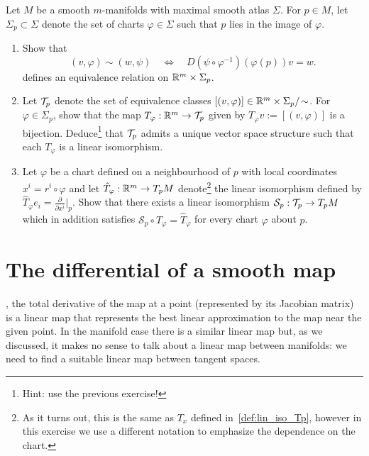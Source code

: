 \begin{exercise}
Let $M$ be a smooth $m$-manifolds with maximal smooth atlas $\Sigma$.
For $p\in M$, let $\Sigma_p \subset \Sigma$ denote the set of charts $\varphi\in\Sigma$ such that $p$ lies in the image of $\varphi$.
\begin{enumerate}
  \item Show that
  \begin{equation}
    (v,\varphi) \sim (w, \psi)
    \quad\Longleftrightarrow\quad
    D(\psi \circ \varphi^{-1})(\varphi(p))v = w.
  \end{equation}
  defines an equivalence relation on $\mathbb{R}^m\times\Sigma_p$.
  \item Let $\mathcal{T}_p$ denote the set of equivalence classes $[(v,\varphi)]\in \mathbb{R}^m\times\Sigma_p/\!\sim$. For $\varphi\in\Sigma_p$, show that the map $T_\varphi:\mathbb{R}^m\to\mathcal{T}_p$ given by $T_\varphi v := [(v,\varphi)]$ is a bijection.
  Deduce\footnote{Hint: use the previous exercise!} that $\mathcal{T}_p$ admits a unique vector space structure such that each $T_\varphi$ is a linear isomorphism.
  \item Let $\varphi$ be a chart defined on a neighbourhood of $p$ with local coordinates $x^i = r^i \circ \varphi$ and let $\hat T_\varphi :\mathbb{R}^m \to T_pM$ denote\footnote{As it turns out, this is the same as $T_x$ defined in~\eqref{def:lin_iso_Tp}, however in this exercise we use a different notation to emphasize the dependence on the chart.} the linear isomorphism defined by $\hat T_\varphi e_i = \frac{\partial}{\partial x^i}\big|_p$.
  Show that there exists a linear isomorphism $\mathcal{S}_p:\mathcal{T}_p\to T_pM$ which in addition satisfies $\mathcal{S}_p \circ T_\varphi = \hat T_\varphi$ for every chart $\varphi$ about $p$.
\end{enumerate}
\end{exercise}

\section{The differential of a smooth map}\label{sec:diffsmooth}

, the total derivative of the map at a point (represented by its Jacobian matrix) is a linear map that represents the best linear approximation to the map near the given point.
In the manifold case there is a similar linear map but, as we discussed, it makes no sense to talk about a linear map between manifolds: we need to find a suitable linear map between tangent spaces.

